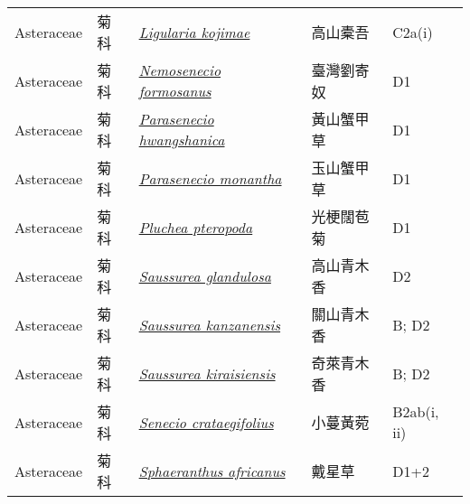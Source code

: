 {\begin{longtable}{p{2.5cm}p{2.5cm}p{4.5cm}p{2.5cm}p{3cm}}
    Asteraceae & 菊科 & \href{http://www.theplantlist.org/tpl1.1/search?q=Ligularia+kojimae}{\textit{Ligularia kojimae} } & 高山橐吾 & C2a(i) \index{Ligularia@\textit{Ligularia}!kojimae@\textit{kojimae}}  \index{高山橐吾} \\
    Asteraceae & 菊科 & \href{http://www.theplantlist.org/tpl1.1/search?q=Nemosenecio+formosanus}{\textit{Nemosenecio formosanus} } & 臺灣劉寄奴 & D1 \index{Nemosenecio@\textit{Nemosenecio}!formosanus@\textit{formosanus}}  \index{臺灣劉寄奴} \\
    Asteraceae & 菊科 & \href{http://www.theplantlist.org/tpl1.1/search?q=Parasenecio+hwangshanica}{\textit{Parasenecio hwangshanica} } & 黃山蟹甲草 & D1 \index{Parasenecio@\textit{Parasenecio}!hwangshanica@\textit{hwangshanica}}  \index{黃山蟹甲草} \\
    Asteraceae & 菊科 & \href{http://www.theplantlist.org/tpl1.1/search?q=Parasenecio+monantha}{\textit{Parasenecio monantha} } & 玉山蟹甲草 & D1 \index{Parasenecio@\textit{Parasenecio}!monantha@\textit{monantha}}  \index{玉山蟹甲草} \\
    Asteraceae & 菊科 & \href{http://www.theplantlist.org/tpl1.1/search?q=Pluchea+pteropoda}{\textit{Pluchea pteropoda} } & 光梗闊苞菊 & D1 \index{Pluchea@\textit{Pluchea}!pteropoda@\textit{pteropoda}}  \index{光梗闊苞菊} \\
    Asteraceae & 菊科 & \href{http://www.theplantlist.org/tpl1.1/search?q=Saussurea+glandulosa}{\textit{Saussurea glandulosa} } & 高山青木香 & D2 \index{Saussurea@\textit{Saussurea}!glandulosa@\textit{glandulosa}}  \index{高山青木香} \\
    Asteraceae & 菊科 & \href{http://www.theplantlist.org/tpl1.1/search?q=Saussurea+kanzanensis}{\textit{Saussurea kanzanensis} } & 關山青木香 & B; D2 \index{Saussurea@\textit{Saussurea}!kanzanensis@\textit{kanzanensis}}  \index{關山青木香} \\
    Asteraceae & 菊科 & \href{http://www.theplantlist.org/tpl1.1/search?q=Saussurea+kiraisiensis}{\textit{Saussurea kiraisiensis} } & 奇萊青木香 & B; D2 \index{Saussurea@\textit{Saussurea}!kiraisiensis@\textit{kiraisiensis}}  \index{奇萊青木香} \\
    Asteraceae & 菊科 & \href{http://www.theplantlist.org/tpl1.1/search?q=Senecio+crataegifolius}{\textit{Senecio crataegifolius} } & 小蔓黃菀 & B2ab(i, ii) \index{Senecio@\textit{Senecio}!crataegifolius@\textit{crataegifolius}}  \index{小蔓黃菀} \\
    Asteraceae & 菊科 & \href{http://www.theplantlist.org/tpl1.1/search?q=Sphaeranthus+africanus}{\textit{Sphaeranthus africanus} } & 戴星草 & D1+2 \index{Sphaeranthus@\textit{Sphaeranthus}!africanus@\textit{africanus}}  \index{戴星草} \\

\end{longtable}}
